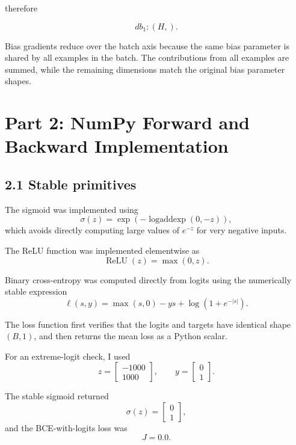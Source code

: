 \documentclass[11pt]{article}
\begin{document}
therefore

    \[
      db_1:(H,).
    \]

Bias gradients reduce over the batch axis because the same bias parameter is shared by all examples in the batch. The contributions from all examples are summed, while the remaining dimensions match the original bias parameter shapes.

\section*{Part 2: NumPy Forward and Backward Implementation}

\subsection*{2.1 Stable primitives}
The sigmoid was implemented using
      \[
        \sigma(z) =
        \exp\left(-\operatorname{logaddexp}(0,-z)\right),
      \]
which avoids directly computing large values of \(e^{-z}\) for very negative
inputs. 

The ReLU function was implemented elementwise as
      \[
        \operatorname{ReLU}(z) = \max(0,z).
      \]

Binary cross-entropy was computed directly from logits using the numerically
stable expression
      \[
        \ell(s,y)
        =
        \max(s,0)
        -
        ys
        +
        \log\left(1+e^{-|s|}\right).
      \]

The loss function first verifies that the logits and targets have identical
shape \((B,1)\), and then returns the mean loss as a Python scalar.

For an extreme-logit check, I used
      \[
        z =
        \begin{bmatrix}
        -1000 \\
        1000
        \end{bmatrix},
        \qquad
        y =
        \begin{bmatrix}
        0 \\
        1
        \end{bmatrix}.
      \]

The stable sigmoid returned
      \[
        \sigma(z) =
        \begin{bmatrix}
        0 \\
        1
        \end{bmatrix},
        \]
        and the BCE-with-logits loss was
        \[
        J = 0.0.
      \]
\end{document}
